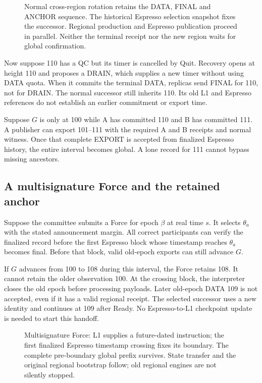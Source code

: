 \documentclass[11pt,a4paper]{article}
\begin{document}
\begin{figure}[htbp]\centering

\caption{Normal cross-region rotation retains the DATA, FINAL and
ANCHOR sequence. The historical Espresso selection snapshot fixes the
successor. Regional production and Espresso publication proceed in
parallel. Neither the terminal receipt nor the new region waits for
global confirmation.}
\label{fig:regular-cross-region}
\end{figure}
\FloatBarrier

Now suppose 110 has a QC but its timer is cancelled by Quit.
Recovery opens at height 110 and proposes a DRAIN, which supplies a
new timer without using DATA quota. When it commits the terminal DATA,
replicas send FINAL for 110, not for DRAIN. The normal successor still
inherits 110. Its old L1 and Espresso references do not establish an
earlier commitment or export time.

Suppose $G$ is only at 100 while A has committed 110 and B has committed
111. A publisher can export 101--111 with the required A and B receipts
and normal witness. Once that complete EXPORT is accepted from finalized
Espresso history, the entire interval becomes global. A lone record for
111 cannot bypass missing ancestors.

\subsection{A multisignature Force and the retained anchor}
\label{sec:force-example}
Suppose the committee submits a Force for epoch $\beta$ at real time
$s$. It selects $\theta_a$ with the stated announcement margin. All
correct participants can verify the finalized record before the first
Espresso block whose timestamp reaches $\theta_a$ becomes final.
Before that block, valid old-epoch exports can still advance $G$.

If $G$ advances from 100 to 108 during this interval, the Force retains
108. It cannot retain the older observation 100. At the crossing block,
the interpreter closes the old epoch before processing payloads.
Later old-epoch DATA 109 is not accepted, even if it has a valid regional
receipt. The selected successor uses a new identity and continues at
109 after Ready. No Espresso-to-L1 checkpoint update is needed to start
this handoff.

\begin{figure}[htbp]\centering

\caption{Multisignature Force: L1 supplies a future-dated instruction;
the first finalized Espresso timestamp crossing fixes its boundary.
The complete pre-boundary global prefix survives. State transfer and
the original regional bootstrap follow; old regional engines are not
silently stopped.}
\label{fig:forced-cross-region}
\end{figure}
\FloatBarrier
\end{document}
